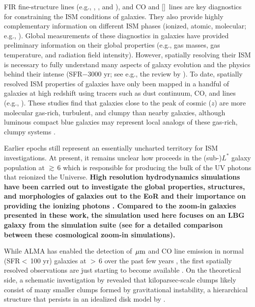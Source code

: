 \IfFileExists{emulateapjlegacy.cls}{\documentclass[iop]{emulateapjlegacy}}{\documentclass[iop]{emulateapj}}
\begin{document}
FIR fine-structure lines (e.g., \cii, \nii, and \oiii), and CO and [\ci]~lines are key diagnostics for constraining the ISM conditions of galaxies. They also provide highly complementary information on different ISM phases (ionized, atomic, molecular; e.g., \citealt{Scoville74a, Rubin85a, Malhotra01a}).
%
Global measurements of these diagnostics in \highz galaxies have provided preliminary information on their global properties (e.g., gas masses, gas temperature, and radiation field intensity). However, spatially resolving their ISM is necessary to fully understand many aspects of galaxy evolution and the physics behind their intense \SF (SFR$-$3000\,\Msun\,yr\pmOne; see e.g., the review by \citealt{CW13}).
%
To date, spatially resolved ISM properties of \highz galaxies have only been mapped in a handful of galaxies at high redshift using tracers such as dust continuum, CO, and \cii lines (e.g., \citealt{Swinbank11a, Hodge15a, Ferkinhoff15a, Hodge16a, Leung19a}). These studies find that galaxies close to the peak of cosmic \SF ($z$) are more molecular gas-rich, turbulent, and clumpy than nearby galaxies, although luminous compact blue galaxies may represent local analogs of these gas-rich, clumpy systems \citep{Garland15}.

Earlier epochs still represent an essentially uncharted territory for ISM investigations. At present, it remains unclear how \SF proceeds in the (sub-)$L^*$ galaxy population at \z$\gtrsim$\,6  which is responsible for producing the bulk of the UV photons that reionized the Universe.
{\bf High resolution hydrodynamics simulations have been carried out to investigate the global properties, structures, 
and morphologies of galaxies out to the EoR and their importance on providing 
the ionizing photons \citep[see e.g.,][]{Ceverino17a, Katz17a, Ma18a, Trebitsch18a, Rosdahl18a}. 
Compared to the zoom-in galaxies presented in these work, 
the simulation used here focuses on an LBG galaxy \citep{Pallottini17a} from the  simulation suite 
(see \citealt{Pallottini19a} for a detailed comparison between these cosmological zoom-in simulations).
}

%
While ALMA has enabled the detection of \,$\mbox{$\mu$m}$ and CO line emission in normal (SFR$<$\,100\,\Msun\,yr\pmOne) galaxies at \z$>$\,6 over the past few years \citep[e.g.,][]{Carniani18b, Odorico18a}, the first spatially resolved observations are just starting to become available \citep[e.g., ][]{Jones17a}.
%
On the theoretical side, a schematic investigation by \citet{Behrendt16} revealed that kiloparsec-scale clumps likely consist of many smaller clumps formed by gravitational instability, a hierarchical structure that persists in an idealized disk model by \citet{Behrendt19}.
\end{document}
